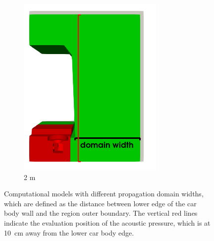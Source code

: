 {\begin{figure}
\begin{subfigure}[b]{0.45\textwidth}
		\includegraphics[width=\linewidth]{fig/chap4/simulation_domain/2m.png}
		\caption{2 m}
		\label{fig:domain_width_2m}
	\end{subfigure}
	\caption{Computational models with different propagation domain widths, which are defined as the distance between lower edge of the car body wall and the region outer boundary. The vertical red lines indicate the evaluation position of the acoustic pressure, which is at \SI{10}{\centi\meter} away from the lower car body edge.}
	\label{fig:domain_size_variation}
\end{figure}

}
